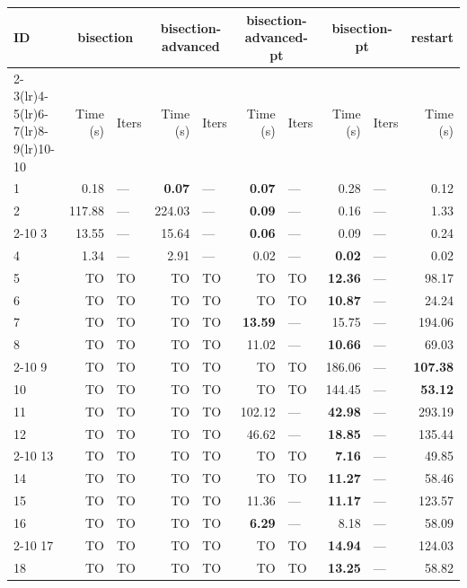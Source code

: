 \begin{longtable}{lr@{\hskip 4pt}l@{\hskip 12pt}r@{\hskip 4pt}l@{\hskip 12pt}r@{\hskip 4pt}l@{\hskip 12pt}r@{\hskip 4pt}l@{\hskip 12pt}r}
\toprule
ID & \multicolumn{2}{c}{bisection} & \multicolumn{2}{c}{bisection-advanced} & \multicolumn{2}{c}{bisection-advanced-pt} & \multicolumn{2}{c}{bisection-pt} & restart \\
\cmidrule(lr){2-3}\cmidrule(lr){4-5}\cmidrule(lr){6-7}\cmidrule(lr){8-9}\cmidrule(lr){10-10}
 & Time (s) &  Iters & Time (s) &  Iters & Time (s) &  Iters & Time (s) &  Iters & Time (s) \\
\midrule
\endhead
1 & 0.18 & --- & \textbf{0.07} & --- & \textbf{0.07} & --- & 0.28 & --- & 0.12 \\
2 & 117.88 & --- & 224.03 & --- & \textbf{0.09} & --- & 0.16 & --- & 1.33 \\
\cmidrule{2-10}
3 & 13.55 & --- & 15.64 & --- & \textbf{0.06} & --- & 0.09 & --- & 0.24 \\
4 & 1.34 & --- & 2.91 & --- & 0.02 & --- & \textbf{0.02} & --- & 0.02 \\
\midrule
5 & TO & TO & TO & TO & TO & TO & \textbf{12.36} & --- & 98.17 \\
6 & TO & TO & TO & TO & TO & TO & \textbf{10.87} & --- & 24.24 \\
7 & TO & TO & TO & TO & \textbf{13.59} & --- & 15.75 & --- & 194.06 \\
8 & TO & TO & TO & TO & 11.02 & --- & \textbf{10.66} & --- & 69.03 \\
\cmidrule{2-10}
9 & TO & TO & TO & TO & TO & TO & 186.06 & --- & \textbf{107.38} \\
10 & TO & TO & TO & TO & TO & TO & 144.45 & --- & \textbf{53.12} \\
11 & TO & TO & TO & TO & 102.12 & --- & \textbf{42.98} & --- & 293.19 \\
12 & TO & TO & TO & TO & 46.62 & --- & \textbf{18.85} & --- & 135.44 \\
\cmidrule{2-10}
13 & TO & TO & TO & TO & TO & TO & \textbf{7.16} & --- & 49.85 \\
14 & TO & TO & TO & TO & TO & TO & \textbf{11.27} & --- & 58.46 \\
15 & TO & TO & TO & TO & 11.36 & --- & \textbf{11.17} & --- & 123.57 \\
16 & TO & TO & TO & TO & \textbf{6.29} & --- & 8.18 & --- & 58.09 \\
\cmidrule{2-10}
17 & TO & TO & TO & TO & TO & TO & \textbf{14.94} & --- & 124.03 \\
18 & TO & TO & TO & TO & TO & TO & \textbf{13.25} & --- & 58.82 \\

\end{longtable}
